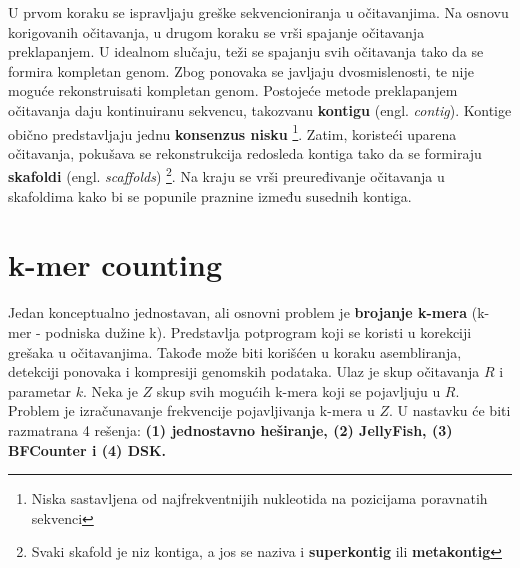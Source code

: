 \documentclass[12pt,oneside]{memoir}
\begin{document}
U prvom koraku se ispravljaju greške sekvencioniranja u očitavanjima. Na osnovu korigovanih očitavanja, u drugom koraku se vrši spajanje očitavanja preklapanjem. U idealnom slučaju, teži se spajanju svih očitavanja tako da se formira kompletan genom. Zbog ponovaka se javljaju dvosmislenosti, te nije moguće rekonstruisati kompletan genom. Postojeće metode preklapanjem očitavanja daju kontinuiranu sekvencu, takozvanu \textbf{kontigu} (engl. \textit{contig}). Kontige obično predstavljaju jednu \textbf{konsenzus nisku} \footnote{Niska sastavljena od najfrekventnijih nukleotida na pozicijama poravnatih sekvenci}. Zatim, koristeći uparena očitavanja, pokušava se rekonstrukcija redosleda kontiga tako da se formiraju \textbf{skafoldi} (engl. \textit{scaffolds}) \footnote{Svaki skafold je niz kontiga, a jos se naziva i \textbf{superkontig} ili \textbf{metakontig}}. Na kraju se vrši preuređivanje očitavanja u skafoldima kako bi se popunile praznine između susednih kontiga.

\section{k-mer counting}

Jedan konceptualno jednostavan, ali osnovni problem je \textbf{brojanje k-mera} (k-mer - podniska dužine k). Predstavlja potprogram koji se koristi u korekciji grešaka u očitavanjima. Takođe može biti korišćen u koraku asembliranja, detekciji ponovaka i kompresiji genomskih podataka. Ulaz je skup očitavanja $R$ i parametar $k$. Neka je $Z$ skup svih mogućih k-mera koji se pojavljuju u $R$. Problem je izračunavanje frekvencije pojavljivanja k-mera u $Z$. U nastavku će biti razmatrana 4 rešenja: \textbf{(1) jednostavno heširanje, (2) JellyFish, (3) BFCounter i (4) DSK.}
\end{document}
